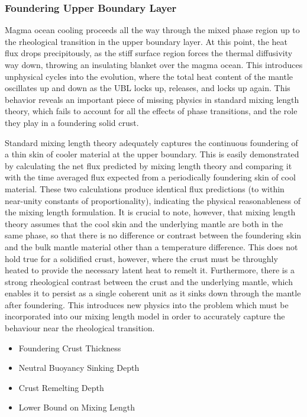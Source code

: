 \subsubsection{Foundering Upper Boundary Layer}
Magma ocean cooling proceeds all the way through the mixed phase region up to the rheological transition in the upper boundary layer.  At this point, the heat flux drops precipitously, as the stiff surface region forces the thermal diffusivity way down, throwing an insulating blanket over the magma ocean.  This introduces unphysical cycles into the evolution, where the total heat content of the mantle oscillates up and down as the UBL locks up, releases, and locks up again.  This behavior reveals an important piece of missing physics in standard mixing length theory, which fails to account for all the effects of phase transitions, and the role they play in a foundering solid crust.

Standard mixing length theory adequately captures the continuous foundering of a thin skin of cooler material at the upper boundary.
This is easily demonstrated by calculating the net flux predicted by mixing length theory and comparing it with the time averaged flux expected from a periodically foundering skin of cool material.  These two calculations produce identical flux predictions (to within near-unity constants of proportionality), indicating the physical reasonableness of the mixing length formulation.  It is crucial to note, however, that mixing length theory assumes that the cool skin and the underlying mantle are both in the same phase, so that there is no difference or contrast between the foundering skin and the bulk mantle material other than a temperature difference.  This does not hold true for a solidified crust, however, where the crust must be throughly heated to provide the necessary latent heat to remelt it.  Furthermore, there is a strong rheological contrast between the crust and the underlying mantle, which enables it to persist as a single coherent unit as it sinks down through the mantle after foundering.  This introduces new physics into the problem which must be incorporated into our mixing length model in order to accurately capture the behaviour near the rheological transition.
\begin{itemize}
\item Foundering Crust Thickness
\item Neutral Buoyancy Sinking Depth
\item Crust Remelting Depth
\item Lower Bound on Mixing Length
\end{itemize}
